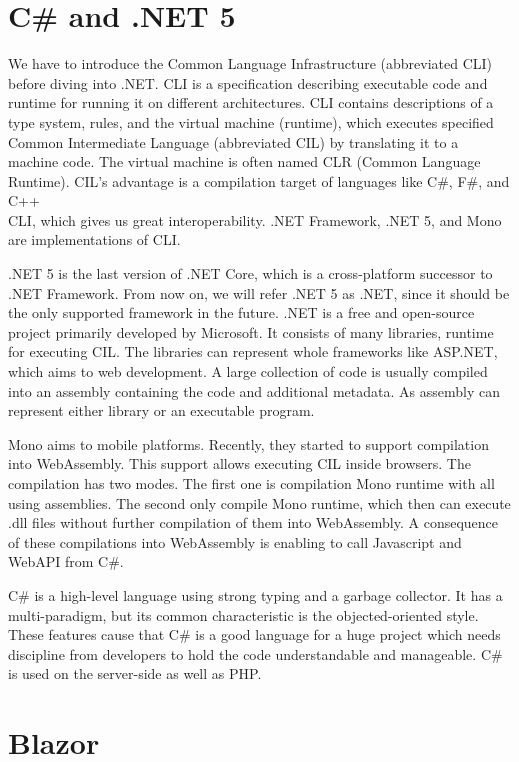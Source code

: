 \section{C\# and .NET 5}

We have to introduce the Common Language Infrastructure (abbreviated CLI)  before diving into .NET.
CLI is a specification describing executable code and runtime for running it on different architectures.
CLI contains descriptions of a type system, rules, and the virtual machine (runtime), which executes specified Common Intermediate Language (abbreviated CIL) by translating it to a machine code. 
The virtual machine is often named CLR (Common Language Runtime).
CIL's advantage is a compilation target of languages like C\#, F\#, and C++\\CLI, which gives us great interoperability.
.NET Framework, .NET 5, and Mono are implementations of CLI.
\par
.NET 5  is the last version of .NET Core, which is a cross-platform successor to .NET Framework.
From now on, we will refer .NET 5 as .NET, since it should be the only supported framework in the future.
.NET is a free and open-source project primarily developed by Microsoft.
It consists of many libraries, runtime for executing CIL.
The libraries can represent whole frameworks like ASP.NET, which aims to web development.
A large collection of code is usually compiled into an assembly containing the code and additional metadata.
As assembly can represent either library or an executable program.
\par
Mono aims to mobile platforms. 
Recently, they started to support compilation  into WebAssembly.
This support allows executing CIL inside browsers.
The compilation has two modes.
The first one is compilation Mono runtime with all using assemblies.
The second only compile Mono runtime, which then can execute .dll files without further compilation of them into WebAssembly.
A consequence of these compilations into WebAssembly is enabling to call Javascript and WebAPI from C\#.
\par
C\# is a high-level language using strong typing and a garbage collector.
It has a multi-paradigm, but its common characteristic is the objected-oriented style.
These features cause that C\# is a good language for a huge project which needs discipline from developers to hold the code understandable and manageable.
C\# is used on the server-side as well as PHP.

\section{Blazor}

